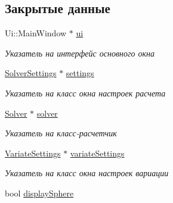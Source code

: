 \subsection*{Закрытые данные}
\begin{DoxyCompactItemize}
\item 
\mbox{\label{class_main_window_a35466a70ed47252a0191168126a352a5}} 
Ui\+::\+Main\+Window $\ast$ \mbox{\hyperlink{class_main_window_a35466a70ed47252a0191168126a352a5}{ui}}
\begin{DoxyCompactList}\small\item\em Указатель на интерфейс основного окна \end{DoxyCompactList}\item 
\mbox{\label{class_main_window_adc4574d1fefa5c732153ca8df70b6f7e}} 
\mbox{\hyperlink{class_solver_settings}{Solver\+Settings}} $\ast$ \mbox{\hyperlink{class_main_window_adc4574d1fefa5c732153ca8df70b6f7e}{settings}}
\begin{DoxyCompactList}\small\item\em Указатель на класс окна настроек расчета \end{DoxyCompactList}\item 
\mbox{\label{class_main_window_a91a43144196d0dfcf2047b1831c0f31a}} 
\mbox{\hyperlink{class_solver}{Solver}} $\ast$ \mbox{\hyperlink{class_main_window_a91a43144196d0dfcf2047b1831c0f31a}{solver}}
\begin{DoxyCompactList}\small\item\em Указатель на класс-\/расчетчик \end{DoxyCompactList}\item 
\mbox{\label{class_main_window_a39d36fc90da7a8bb3d1b7fd288393d15}} 
\mbox{\hyperlink{class_variate_settings}{Variate\+Settings}} $\ast$ \mbox{\hyperlink{class_main_window_a39d36fc90da7a8bb3d1b7fd288393d15}{variate\+Settings}}
\begin{DoxyCompactList}\small\item\em Указатель на класс окна настроек вариации \end{DoxyCompactList}\item 
\mbox{\label{class_main_window_a686db6780a84b7e68b095b4c05cd991a}} 
bool \mbox{\hyperlink{class_main_window_a686db6780a84b7e68b095b4c05cd991a}{display\+Sphere}}

\end{DoxyCompactItemize}
